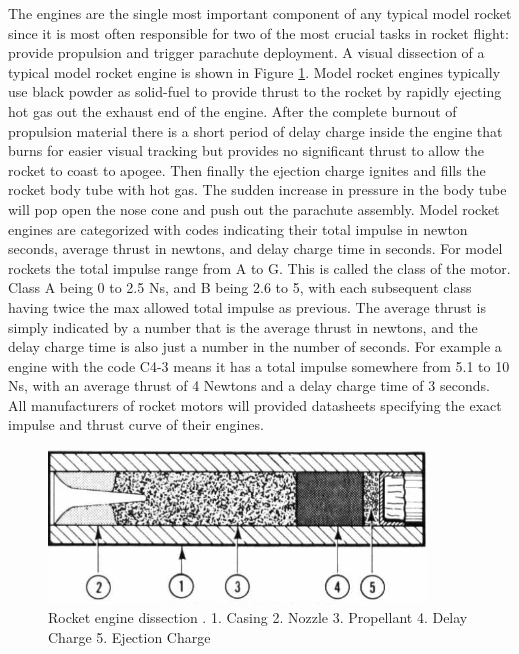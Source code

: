 \documentclass{workreport}
\begin{document}
\begin{body}
	The engines are the single most important component of any typical model rocket since it is most often responsible for two of the most crucial tasks in rocket flight: provide propulsion and trigger parachute deployment. A visual dissection of a typical model rocket engine is shown in Figure \ref{fig:dissection}. Model rocket engines typically use black powder as solid-fuel to provide thrust to the rocket by rapidly ejecting hot gas out the exhaust end of the engine. After the complete burnout of propulsion material there is a short period of delay charge inside the engine that burns for easier visual tracking but provides no significant thrust to allow the rocket to coast to apogee. Then finally the ejection charge ignites and fills the rocket body tube with hot gas. The sudden increase in pressure in the body tube will pop open the nose cone and push out the parachute assembly. Model rocket engines are categorized with codes indicating their total impulse in newton seconds, average thrust in newtons, and delay charge time in seconds. For model rockets the total impulse range from A to G. This is called the class of the motor. Class A being 0 to 2.5 Ns, and B being 2.6 to 5, with each subsequent class having twice the max allowed total impulse as previous. The average thrust is simply indicated by a number that is the average thrust in newtons, and the delay charge time is also just a number in the number of seconds.
	For example a engine with the code C4-3 means it has a total impulse somewhere from 5.1 to 10 Ns, with an average thrust of 4 Newtons and a delay charge time of 3 seconds. All manufacturers of rocket motors will provided datasheets specifying the exact impulse and thrust curve of their engines.

	\begin{figure}[!ht]
		\centering
		\includegraphics[width=10cm]{./images/dissection.png}
		\caption{Rocket engine dissection \cite{centuri_manual}. 1. Casing 2. Nozzle 3. Propellant 4. Delay Charge 5. Ejection Charge}
		\label{fig:dissection}
	\end{figure}


\end{body}
\end{document}
